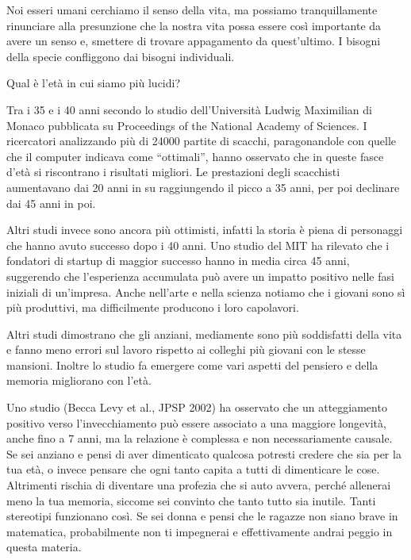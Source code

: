 \documentclass[12pt]{book} %
\begin{document}
Noi esseri umani cerchiamo il senso della vita, ma possiamo tranquillamente rinunciare alla presunzione che la nostra
vita possa essere così importante da avere un senso e, smettere di trovare appagamento da
quest'ultimo. I bisogni della specie confliggono dai bisogni individuali.

\begin{mdframed}[linewidth=1pt]
Qual è l'età in cui siamo più lucidi?

Tra i 35 e i 40 anni secondo lo studio dell'Università Ludwig Maximilian di Monaco pubblicata su Proceedings of the
National Academy of Sciences. I ricercatori analizzando più di 24000 partite di scacchi, paragonandole con quelle che
il computer indicava come “ottimali”, hanno osservato che in queste fasce d'età si riscontrano i risultati migliori. Le prestazioni degli scacchisti aumentavano dai 20 anni in su raggiungendo il picco a 35 anni, per
poi declinare dai 45 anni in poi. 

Altri studi invece sono ancora più ottimisti, infatti la storia è piena di personaggi che hanno avuto successo dopo i 40 anni. Uno studio del MIT ha rilevato che i fondatori di startup di maggior successo hanno in media circa 45 anni, suggerendo che l’esperienza accumulata può avere un impatto positivo nelle fasi iniziali di un’impresa. Anche nell'arte e
nella scienza notiamo che i giovani sono sì più produttivi, ma difficilmente producono i loro capolavori.

Altri studi dimostrano che gli anziani, mediamente sono più soddisfatti della vita e fanno meno errori sul lavoro
rispetto ai colleghi più giovani con le stesse mansioni. Inoltre lo studio fa emergere come vari aspetti del pensiero e
della memoria migliorano con l'età.

Uno studio (Becca Levy et al., JPSP 2002) ha osservato che un atteggiamento positivo verso l’invecchiamento può essere associato a una maggiore longevità, anche fino a 7 anni, ma la relazione è complessa e non necessariamente causale. Se sei anziano e pensi di aver dimenticato
qualcosa potresti credere che sia per la tua età, o invece pensare che ogni tanto capita a tutti di dimenticare le cose. Altrimenti rischia di diventare una profezia che si auto avvera, perché allenerai meno la tua memoria, siccome sei
convinto che tanto tutto sia inutile. Tanti stereotipi funzionano così. Se sei donna
e pensi che le ragazze non siano brave in matematica, probabilmente non ti impegnerai e effettivamente andrai peggio in questa materia.


\end{mdframed}
\end{document}
